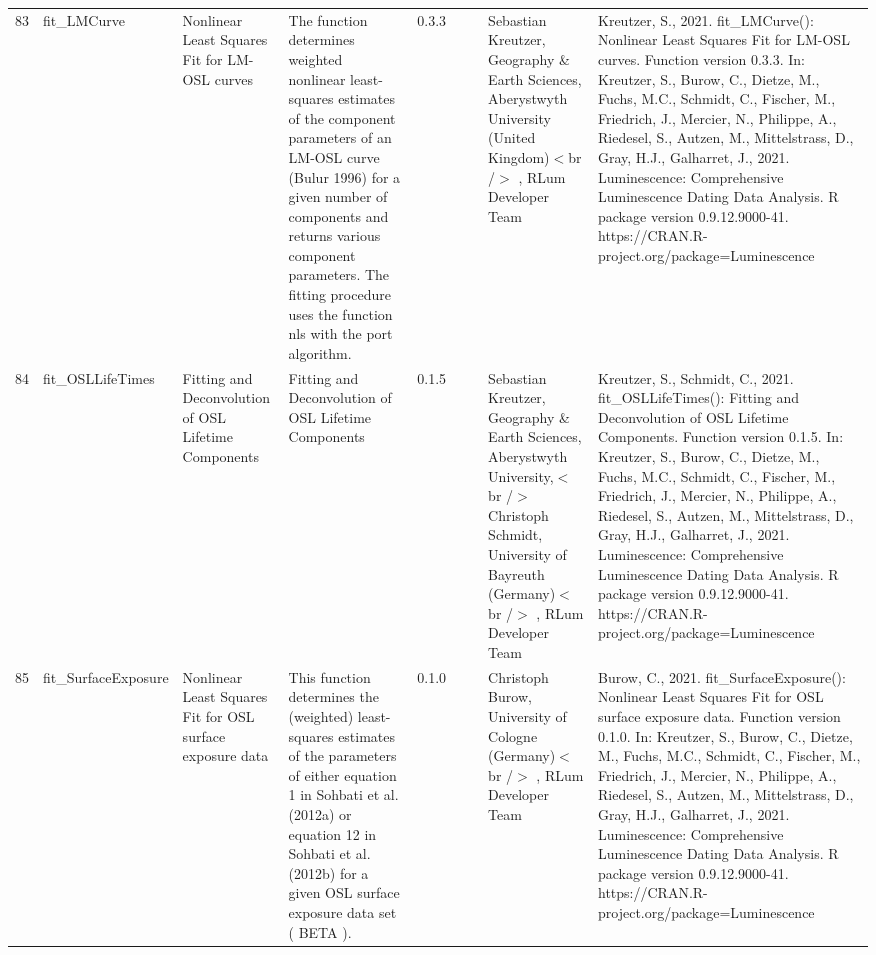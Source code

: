 \begin{table}[ht]
\begin{tabular}{rllllllll}
  83 & fit\_LMCurve & Nonlinear Least Squares Fit for LM-OSL curves & The function determines weighted nonlinear least-squares estimates of the component parameters of an LM-OSL curve (Bulur 1996) for a given number of components and returns various component parameters. The fitting procedure uses the function  nls  with the  port  algorithm. & 0.3.3
 &  &  & Sebastian Kreutzer, Geography \& Earth Sciences, Aberystwyth University (United Kingdom)$<$br /$>$ , RLum Developer Team & Kreutzer, S., 2021. fit\_LMCurve(): Nonlinear Least Squares Fit for LM-OSL curves. Function version 0.3.3. In: Kreutzer, S., Burow, C., Dietze, M., Fuchs, M.C., Schmidt, C., Fischer, M., Friedrich, J., Mercier, N., Philippe, A., Riedesel, S., Autzen, M., Mittelstrass, D., Gray, H.J., Galharret, J., 2021. Luminescence: Comprehensive Luminescence Dating Data Analysis. R package version 0.9.12.9000-41. https://CRAN.R-project.org/package=Luminescence
 \\ 
  84 & fit\_OSLLifeTimes & Fitting and Deconvolution of OSL Lifetime Components & Fitting and Deconvolution of OSL Lifetime Components & 0.1.5
 &  &  & Sebastian Kreutzer, Geography \& Earth Sciences, Aberystwyth University,$<$br /$>$ Christoph Schmidt, University of Bayreuth (Germany)$<$br /$>$ , RLum Developer Team & Kreutzer, S., Schmidt, C., 2021. fit\_OSLLifeTimes(): Fitting and Deconvolution of OSL Lifetime Components. Function version 0.1.5. In: Kreutzer, S., Burow, C., Dietze, M., Fuchs, M.C., Schmidt, C., Fischer, M., Friedrich, J., Mercier, N., Philippe, A., Riedesel, S., Autzen, M., Mittelstrass, D., Gray, H.J., Galharret, J., 2021. Luminescence: Comprehensive Luminescence Dating Data Analysis. R package version 0.9.12.9000-41. https://CRAN.R-project.org/package=Luminescence
 \\ 
  85 & fit\_SurfaceExposure & Nonlinear Least Squares Fit for OSL surface exposure data & This function determines the (weighted) least-squares estimates of the parameters of either equation 1 in  Sohbati et al. (2012a)  or equation 12 in Sohbati et al. (2012b)  for a given OSL surface exposure data set ( BETA ). & 0.1.0
 &  &  & Christoph Burow, University of Cologne (Germany)$<$br /$>$ , RLum Developer Team & Burow, C., 2021. fit\_SurfaceExposure(): Nonlinear Least Squares Fit for OSL surface exposure data. Function version 0.1.0. In: Kreutzer, S., Burow, C., Dietze, M., Fuchs, M.C., Schmidt, C., Fischer, M., Friedrich, J., Mercier, N., Philippe, A., Riedesel, S., Autzen, M., Mittelstrass, D., Gray, H.J., Galharret, J., 2021. Luminescence: Comprehensive Luminescence Dating Data Analysis. R package version 0.9.12.9000-41. https://CRAN.R-project.org/package=Luminescence

\end{tabular}
\end{table}
